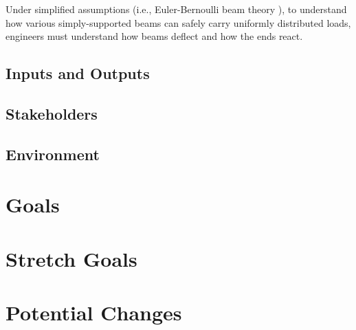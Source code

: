 \documentclass{article}
\begin{document}
Under simplified assumptions (i.e., Euler-Bernoulli beam theory
\cite{EulerBernoulliWiki}), to understand how various simply-supported beams can
safely carry uniformly distributed loads, engineers must understand how beams
deflect and how the ends react.

\subsection{Inputs and Outputs}
\label{problem-statement:inputs-and-outputs}


\subsection{Stakeholders}
\label{problem-statement:stakeholders}

\subsection{Environment}
\label{problem-statement:environment}


\section{Goals}
\label{goals}

\section{Stretch Goals}
\label{goals:stretch-goals}

\section{Potential Changes}
\label{potential-changes}

\newpage

\printbibliography[heading=bibintoc]
\end{document}
